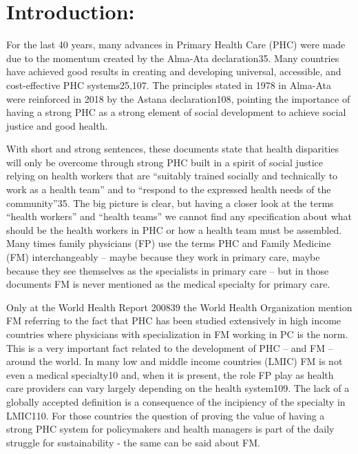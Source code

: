 \documentclass[]{book}
\begin{document}
\hypertarget{introduction-1}{%
\section*{Introduction:}\label{introduction-1}}

For the last 40 years, many advances in Primary Health Care (PHC) were made due to the momentum created by the Alma-Ata declaration35. Many countries have achieved good results in creating and developing universal, accessible, and cost-effective PHC systems25,107. The principles stated in 1978 in Alma-Ata were reinforced in 2018 by the Astana declaration108, pointing the importance of having a strong PHC as a strong element of social development to achieve social justice and good health.

With short and strong sentences, these documents state that health disparities will only be overcome through strong PHC built in a spirit of social justice relying on health workers that are ``suitably trained socially and technically to work as a health team'' and to ``respond to the expressed health needs of the community''35. The big picture is clear, but having a closer look at the terms ``health workers'' and ``health teams'' we cannot find any specification about what should be the health workers in PHC or how a health team must be assembled. Many times family physicians (FP) use the terms PHC and Family Medicine (FM) interchangeably -- maybe because they work in primary care, maybe because they see themselves as the specialists in primary care -- but in those documents FM is never mentioned as the medical specialty for primary care.

Only at the World Health Report 200839 the World Health Organization mention FM referring to the fact that PHC has been studied extensively in high income countries where physicians with specialization in FM working in PC is the norm. This is a very important fact related to the development of PHC -- and FM -- around the world. In many low and middle income countries (LMIC) FM is not even a medical specialty10 and, when it is present, the role FP play as health care providers can vary largely depending on the health system109. The lack of a globally accepted definition is a consequence of the incipiency of the specialty in LMIC110. For those countries the question of proving the value of having a strong PHC system for policymakers and health managers is part of the daily struggle for sustainability - the same can be said about FM.
\end{document}
